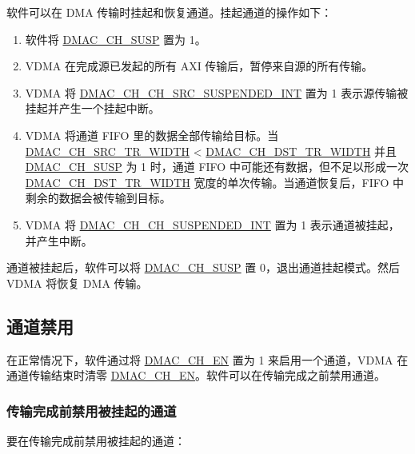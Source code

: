 \documentclass[main\_\_CN.tex]{subfiles}
\begin{document}
软件可以在 DMA 传输时挂起和恢复通道。挂起通道的操作如下：
\begin{enumerate}
    \item 软件将 \hyperref[fielddesc:DMACCH1SUSP]{DMAC\_CH\_SUSP} 置为 1。
    \item VDMA 在完成源已发起的所有 AXI 传输后，暂停来自源的所有传输。
    \item VDMA 将 \hyperref[int:DMACCHNCHSRCSUSPENDEDINT]{DMAC\_CH\_CH\_SRC\_SUSPENDED\_INT} 置为 1 表示源传输被挂起并产生一个挂起中断。

    \item VDMA 将通道 FIFO 里的数据全部传输给目标。当 \hyperref[fielddesc:DMACCHNSRCTRWIDTH]{DMAC\_CH\_SRC\_TR\_WIDTH} < \hyperref[fielddesc:DMACCHNDSTTRWIDTH]{DMAC\_CH\_DST\_TR\_WIDTH} 并且 \hyperref[fielddesc:DMACCH1SUSP]{DMAC\_CH\_SUSP} 为 1 时，通道 FIFO 中可能还有数据，但不足以形成一次 \hyperref[fielddesc:DMACCHNDSTTRWIDTH]{DMAC\_CH\_DST\_TR\_WIDTH} 宽度的单次传输。当通道恢复后，FIFO 中剩余的数据会被传输到目标。

    \item VDMA 将 \hyperref[int:DMACCHNCHSUSPENDEDINT]{DMAC\_CH\_CH\_SUSPENDED\_INT} 置为 1 表示通道被挂起，并产生中断。

\end{enumerate}

通道被挂起后，软件可以将 \hyperref[fielddesc:DMACCH1SUSP]{DMAC\_CH\_SUSP} 置 0，退出通道挂起模式。然后 VDMA 将恢复 DMA 传输。

\subsection{通道禁用}

在正常情况下，软件通过将 \hyperref[fielddesc:DMACCH1EN]{DMAC\_CH\_EN} 置为 1 来启用一个通道，VDMA 在通道传输结束时清零 \hyperref[fielddesc:DMACCH1EN]{DMAC\_CH\_EN}。软件可以在传输完成之前禁用通道。

\subsubsection{传输完成前禁用被挂起的通道}

要在传输完成前禁用被挂起的通道：
\end{document}
